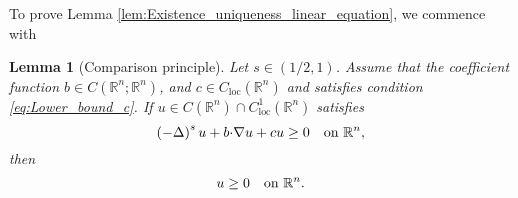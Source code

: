 \documentclass[11pt,reqno]{amsart}
\newtheorem{lem}[thm]{Lemma}
\theoremstyle{definition}
\theoremstyle{remark}
\begin{document}
To prove Lemma \ref{lem:Existence_uniqueness_linear_equation}, we commence with

\begin{lem}[Comparison principle]
\label{lem:Comparison_principle}
Let $s\in (1/2,1)$. Assume that the coefficient function $b\in C({\mathbb{R}}^n;{\mathbb{R}}^n)$, and $c\in C_{\operatorname{loc}}({\mathbb{R}}^n)$ and satisfies condition \eqref{eq:Lower_bound_c}. If $u \in C({\mathbb{R}}^n)\cap C^1_{\operatorname{loc}}({\mathbb{R}}^n)$ satisfies
\begin{equation}
\label{eq:Lu_nonnegative}
\left(-\Delta\right)^s u + b{\hbox{$\cdot$}}\nabla u +c u \geq 0\quad\hbox{on }{\mathbb{R}}^n,
\end{equation}
then
\begin{equation}
\label{eq:u_nonnegative}
u \geq 0 \quad\hbox{on }{\mathbb{R}}^n.
\end{equation}
\end{lem}
\end{document}
